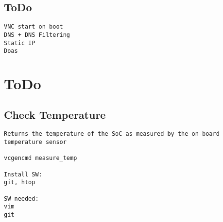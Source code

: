 \documentclass[10pt, a4paper, onecolumn, openany]{book} %
\begin{document}
\section{ToDo}
\begin{Verbatim}[commandchars=\\\{\}]
VNC start on boot
DNS + DNS Filtering
Static IP
Doas
\end{Verbatim}


\chapter{ToDo}
\section{Check Temperature}
\begin{Verbatim}[commandchars=\\\{\}]
Returns the temperature of the SoC as measured by the on-board temperature sensor

vcgencmd measure_temp

Install SW:
git, htop

SW needed:
vim
git
\end{Verbatim}
\end{document}
